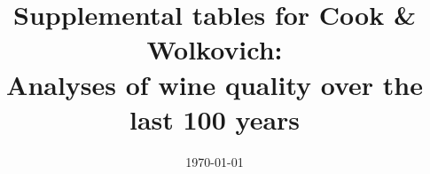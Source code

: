 \documentclass{article}
\begin{document}
% 

\title{Supplemental tables for Cook \& Wolkovich: \\ Analyses of wine quality over the last 100 years}
\date{\today}
\maketitle  %
\renewcommand{\thetable}{S\arabic{table}}
\renewcommand{\thefigure}{S\arabic{figure}}


\end{document}
